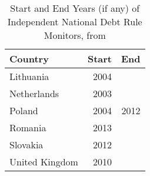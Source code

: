 \begin{table}[ht]
\centering
\caption{Start and End Years (if any) of Independent National Debt Rule Monitors, from \cite{bova2015rules}} 

\label{indep_monitors}
\begin{tabular}{lrr}
  \hline
Country & Start & End \\ 
  \hline
Lithuania & 2004 &  \\ 
  Netherlands & 2003 &  \\ 
  Poland & 2004 & 2012 \\ 
  Romania & 2013 &  \\ 
  Slovakia & 2012 &  \\ 
  United Kingdom & 2010 &  \\ 
   \hline
\end{tabular}
\end{table}
